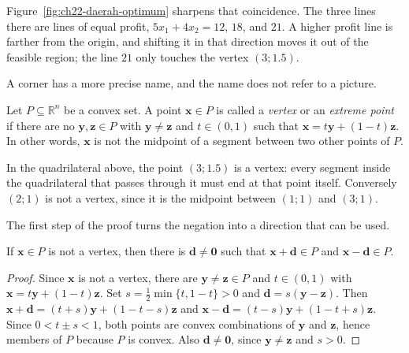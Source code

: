 Figure~\ref{fig:ch22-daerah-optimum} sharpens that coincidence. The three lines there are
lines of equal profit, $5x_{1}+4x_{2}=12$, $18$, and $21$. A higher profit line is farther from
the origin, and shifting it in that direction moves it out of the feasible region; the line
$21$ only touches the vertex $(3;1.5)$.

A corner has a more precise name, and the name does not refer to a picture.

\begin{definisi}[Vertex]
Let $P\subseteq\mathbb{R}^{n}$ be a convex set. A point $\mathbf{x}\in P$ is called a
\emph{vertex} or an \emph{extreme point} if there are no $\mathbf{y},\mathbf{z}\in P$ with
$\mathbf{y}\ne\mathbf{z}$ and $t\in(0,1)$ such that
$\mathbf{x}=t\mathbf{y}+(1-t)\mathbf{z}$. In other words, $\mathbf{x}$ is not the midpoint of
a segment between two other points of $P$.
\end{definisi}

In the quadrilateral above, the point $(3;1.5)$ is a vertex: every segment inside the
quadrilateral that passes through it must end at that point itself. Conversely $(2;1)$ is not a
vertex, since it is the midpoint between $(1;1)$ and $(3;1)$.


The first step of the proof turns the negation into a direction that can be used.

\begin{lemma}
If $\mathbf{x}\in P$ is not a vertex, then there is $\mathbf{d}\ne\mathbf{0}$ such that
$\mathbf{x}+\mathbf{d}\in P$ and $\mathbf{x}-\mathbf{d}\in P$.
\end{lemma}

\begin{proof}
Since $\mathbf{x}$ is not a vertex, there are $\mathbf{y}\ne\mathbf{z}\in P$ and $t\in(0,1)$
with $\mathbf{x}=t\mathbf{y}+(1-t)\mathbf{z}$. Set
$s=\tfrac12\min\{t,1-t\}>0$ and $\mathbf{d}=s(\mathbf{y}-\mathbf{z})$. Then
$\mathbf{x}+\mathbf{d}=(t+s)\mathbf{y}+(1-t-s)\mathbf{z}$ and
$\mathbf{x}-\mathbf{d}=(t-s)\mathbf{y}+(1-t+s)\mathbf{z}$. Since $0<t\pm s<1$, both
points are convex combinations of $\mathbf{y}$ and $\mathbf{z}$, hence members of $P$ because
$P$ is convex. Also $\mathbf{d}\ne\mathbf{0}$, since $\mathbf{y}\ne\mathbf{z}$ and $s>0$.
\end{proof}

